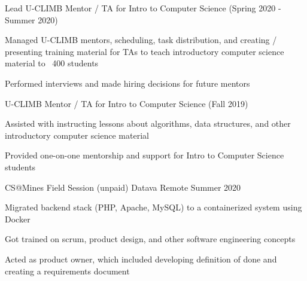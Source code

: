 \begin{cventries}
    \vspace{-1.0mm}
    \cventry
    {Lead U-CLIMB Mentor / TA for Intro to Computer Science (Spring 2020 - Summer 2020)}
    {}
    {}
      {}
    {
    \begin{cvitems}
      \item {Managed U-CLIMB mentors, scheduling, task distribution, and creating / presenting training material for TAs to teach introductory computer science material to ~400 students}
      \item {Performed interviews and made hiring decisions for future mentors}
    \end{cvitems}
    }
    {}
    \cventry
    {U-CLIMB Mentor / TA for Intro to Computer Science (Fall 2019)}
    {}
    {}
    {}
    {
      \ifcv
      \begin{cvitems}
        \item {Assisted with instructing lessons about algorithms, data structures, and other introductory computer science material}
        \item {Provided one-on-one mentorship and support for Intro to Computer Science students}
      \end{cvitems}
      \fi
    }
    {}
    \ifcv
    \vspace{-1.0mm}
    \else
    \vspace{-4.0mm}
    \fi


      \ifcv
    \cventry
    {CS@Mines Field Session (unpaid)}
    {Datava}
    {Remote}
    {Summer 2020}
    {
      \begin{cvitems}
        \item Migrated backend stack (PHP, Apache, MySQL) to a containerized system using Docker
        \item Got trained on scrum, product design, and other software engineering concepts
        \item Acted as product owner, which included developing definition of done and creating a requirements document
      \end{cvitems}
    }
    {}

    


\end{cventries}

